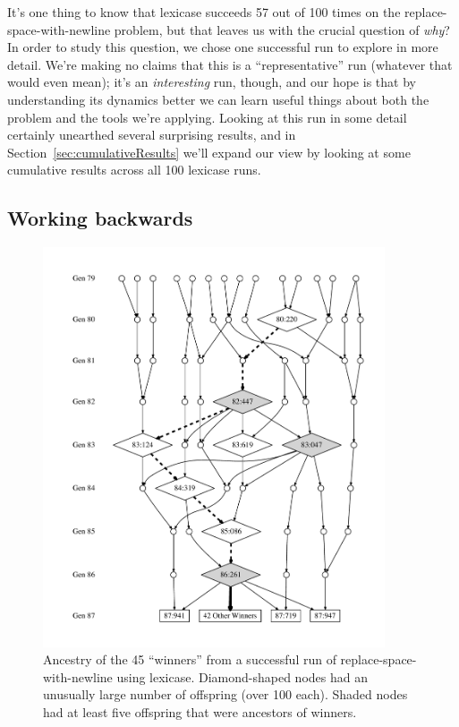 
It's one thing to know that lexicase succeeds 57 out of 100 times on the replace-space-with-newline problem, but that
leaves us with the crucial question of \emph{why}? In order to study this question, we chose one successful 
run to explore in more detail.
We're making no claims that this is a ``representative'' run (whatever that would even
mean); it's an \emph{interesting} run, though, and our hope is that by understanding its dynamics
better we can learn useful things about both the problem and the tools we're applying. Looking at this run in some
detail certainly unearthed several surprising results, and in Section~\ref{sec:cumulativeResults}
we'll expand our view by looking at some cumulative results across all 100 lexicase runs.

\subsection{Working backwards}

\begin{figure}[tp]
	\begin{center}
	\includegraphics[width=0.9\textwidth]{figures/ancestors_of_winners_colons.pdf}
	\end{center}
	\caption{Ancestry of the 45 ``winners'' from a successful run of replace-space-with-newline using
		lexicase. Diamond-shaped nodes
		had an unusually large number of offspring (over 100 each). Shaded nodes
		had at least five offspring that were ancestors of winners.}
	\label{fig:winnerAncestors}
\end{figure}


